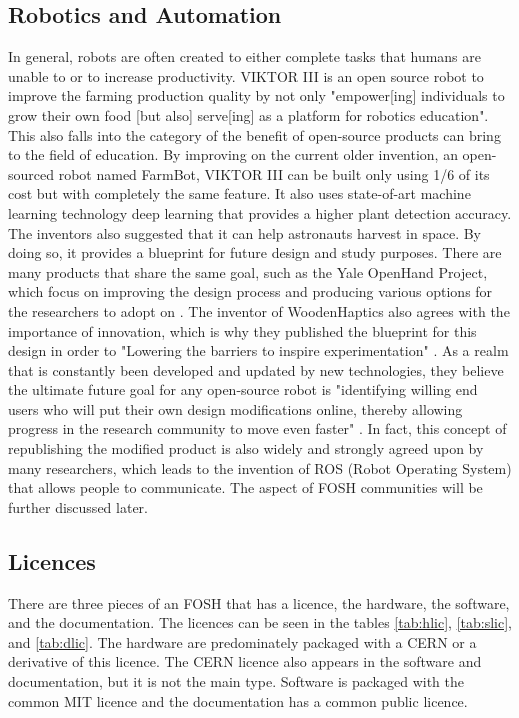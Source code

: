 \documentclass[final-report.tex]{subfiles}
\begin{document}
\subsection{Robotics and Automation}
In general, robots are often created to either complete tasks that humans are unable to or to increase productivity. 
VIKTOR III is an open source robot to improve the farming production quality by not only "empower[ing] individuals to grow their own food [but also] serve[ing] as a platform for robotics education".
This also falls into the category of the benefit of open-source products can bring to the field of education. By improving on the current older invention, an open-sourced robot named FarmBot, VIKTOR III can be built only using 1/6 of its cost but with completely the same feature. 
It also uses state-of-art machine learning technology deep learning that provides a higher plant detection accuracy. 
The inventors also suggested that it can help astronauts harvest in space. 
By doing so, it provides a blueprint for future design and study purposes. 
There are many products that share the same goal, such as the Yale OpenHand Project, which focus on improving the design process and producing various options for the researchers to adopt on \cite{ma2017yale}. 
The inventor of WoodenHaptics also agrees with the importance of innovation, which is why they published the blueprint for this design in order to "Lowering the barriers to inspire experimentation" \cite{yip2017spurring}. 
As a realm that is constantly been developed and updated by new technologies, they believe the ultimate future goal for any open-source robot is "identifying willing end users who will put their own design modifications online, thereby allowing progress in the research community to move even faster" \cite{yip2017spurring}. 
In fact, this concept of republishing the modified product is also widely and strongly agreed upon by many researchers, which leads to the invention of ROS\cite{alami2018influencers} (Robot Operating System) that allows people to communicate. 
The aspect of FOSH communities will be further discussed later. 

\subsection{Licences}
There are three pieces of an FOSH that has a licence, the hardware, the software, and the documentation.
The licences can be seen in the tables \ref{tab:hlic}, \ref{tab:slic}, and \ref{tab:dlic}.
The hardware are predominately packaged with a CERN or a derivative of this licence.
The CERN licence also appears in the software and documentation, but it is not the main type. 
Software is packaged with the common MIT licence and the documentation has a common public licence.
\end{document}
